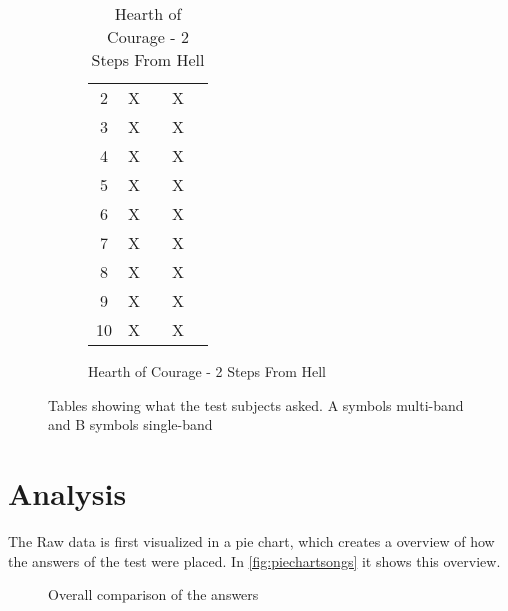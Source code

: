 \begin{figure}[H]
\begin{subfigure}[t]{0.20\textwidth}
\begin{table}[H]
\begin{tabular}{ccccc}
2          & X         &           & X         &          \\
3          & X         &           & X         &          \\
4          & X         &           & X         &          \\ 
5          & X         &           & X         &          \\ \hline
6          & X         &           & X         &          \\
7          & X         &           & X         &          \\
8          & X         &           & X         &          \\
9          & X         &           & X         &          \\
10         & X         &           & X         &          \\ \bottomrule
\end{tabular}
\caption{Hearth of Courage - 2 Steps From Hell}
\label{tab:HearthofCourage}
\end{table}
\end{subfigure}

\caption{Tables showing what the test subjects asked. A symbols multi-band and B symbols single-band}
\label{tab:combinedanswers}
\end{figure}  

\vspace*{-5mm}
\section{Analysis}
The Raw data is first visualized in a pie chart, which creates a overview of how the answers of the test were placed. In \autoref{fig:piechartsongs} it shows this overview.
\begin{figure}[H]
\centering
{}
\caption{Overall comparison of the answers}
\label{fig:piechartsongs}
\end{figure}

